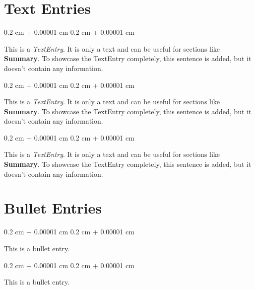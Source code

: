 \documentclass[10pt, letterpaper]{article}
\newenvironment{onecolentry}{
    \begin{adjustwidth}{
        0.2 cm + 0.00001 cm
    }{
        0.2 cm + 0.00001 cm
    }
}{
    \end{adjustwidth}
} %
\begin{document}
    \section{Text Entries}

        
        \begin{onecolentry}
            This is a \textit{TextEntry}. It is only a text and can be useful for sections like \textbf{Summary}. To showcase the TextEntry completely, this sentence is added, but it doesn't contain any information.
        \end{onecolentry}

        \vspace{0.2 cm}

        \begin{onecolentry}
            This is a \textit{TextEntry}. It is only a text and can be useful for sections like \textbf{Summary}. To showcase the TextEntry completely, this sentence is added, but it doesn't contain any information.
        \end{onecolentry}

        \vspace{0.2 cm}

        \begin{onecolentry}
            This is a \textit{TextEntry}. It is only a text and can be useful for sections like \textbf{Summary}. To showcase the TextEntry completely, this sentence is added, but it doesn't contain any information.
        \end{onecolentry}


    
    \section{Bullet Entries}

        
        \begin{onecolentry}
            \textbullet \hspace{0.6 cm-0.2cm}This is a bullet entry.
        \end{onecolentry}

        \vspace{0.2 cm}

        \begin{onecolentry}
            \textbullet \hspace{0.6 cm-0.2cm}This is a bullet entry.
        \end{onecolentry}
\end{document}
